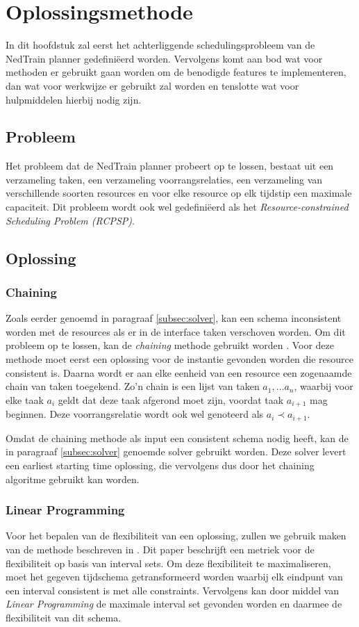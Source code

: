 \section{Oplossingsmethode}
In dit hoofdstuk zal eerst het achterliggende schedulingsprobleem van de NedTrain planner gedefini\"eerd worden. 
Vervolgens komt aan bod wat voor methoden er gebruikt gaan worden om de benodigde features te implementeren, dan wat voor werkwijze er gebruikt zal worden en tenslotte wat voor hulpmiddelen hierbij nodig zijn.

\subsection{Probleem}
Het probleem dat de NedTrain planner probeert op te lossen, bestaat uit een verzameling taken, een verzameling voorrangsrelaties, een verzameling van verschillende soorten resources en voor elke resource op elk tijdstip een maximale capaciteit. Dit probleem wordt ook wel gedefini\"eerd als het \emph{Resource-constrained Scheduling Problem (RCPSP)}. 

\subsection{Oplossing}


\subsubsection*{Chaining}
Zoals eerder genoemd in paragraaf \ref{subsec:solver}, kan een schema inconsistent worden met de resources als er in de interface taken verschoven worden. Om dit probleem op te lossen, kan de \emph{chaining} methode gebruikt worden \cite{policella2007precedence}. Voor deze methode moet eerst een oplossing voor de instantie gevonden worden die resource consistent is. Daarna wordt er aan elke eenheid van een resource een zogenaamde chain van taken toegekend. Zo'n chain is een lijst van taken $a_1, \dots a_n$, waarbij voor elke taak $a_i$ geldt dat deze taak afgerond moet zijn, voordat taak $a_{i+1}$ mag beginnen. Deze voorrangsrelatie wordt ook wel genoteerd als $a_i \prec a_{i+1}$.

Omdat de chaining methode als input een consistent schema nodig heeft, kan de in paragraaf \ref{subsec:solver} genoemde solver gebruikt worden. Deze solver levert een earliest starting time oplossing, die vervolgens dus door het chaining algoritme gebruikt kan worden.


\subsubsection*{Linear Programming}
Voor het bepalen van de flexibiliteit van een oplossing, zullen we gebruik maken van de methode beschreven in \cite{wilson2013flexibility}. Dit paper beschrijft een metriek voor de flexibiliteit op basis van interval sets. Om deze flexibiliteit te maximaliseren, moet het gegeven tijdschema getransformeerd worden waarbij elk eindpunt van een interval consistent is met alle constraints. Vervolgens kan door middel van \emph{Linear Programming} de maximale interval set gevonden worden en daarmee de flexibiliteit van dit schema.

